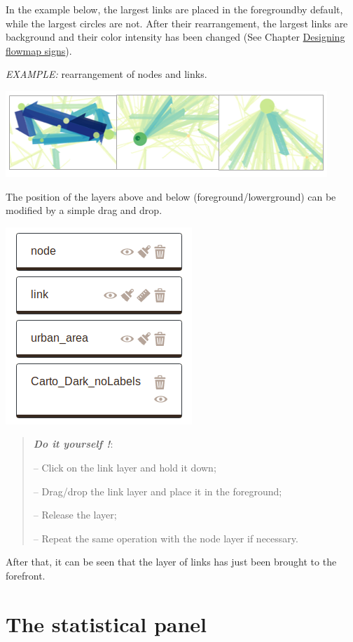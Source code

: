 \documentclass[
  letterpaper,
  DIV=11,
  numbers=noendperiod]{scrreprt}
\begin{document}
In the example below, the largest links are placed in the foregroundby
default, while the largest circles are not. After their rearrangement,
the largest links are background and their color intensity has been
changed (See Chapter \href{./Design-flowmap-signs.html}{Designing
flowmap signs}).

\emph{EXAMPLE:} rearrangement of nodes and links.

\includegraphics{images/Dispositions.png}

The position of the layers above and below (foreground/lowerground) can
be modified by a simple drag and drop.

\includegraphics{images/Layout_dragdrop.png}

\begin{quote}
\textbf{\emph{Do it yourself !}}:

-- Click on the link layer and hold it down;

-- Drag/drop the link layer and place it in the foreground;

-- Release the layer;

-- Repeat the same operation with the node layer if necessary.
\end{quote}

After that, it can be seen that the layer of links has just been brought
to the forefront.

\section{The statistical panel}\label{the-statistical-panel}
\end{document}
